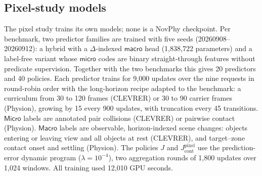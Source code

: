 \begin{revblock}
\subsection{Pixel-study models}

The pixel study trains its own models; none is a NovPhy checkpoint. Per benchmark, two predictor families are trained with five seeds (20260908--20260912): a hybrid with a $\Delta$-indexed $\textsf{macro}$ head (1,838,722 parameters) and a label-free variant whose $\textsf{micro}$ codes are binary straight-through features without predicate supervision. Together with the two benchmarks this gives 20 predictors and 40 policies. Each predictor trains for 9,000 updates over the nine requests in round-robin order with the long-horizon recipe adapted to the benchmark: a curriculum from 30 to 120 frames (CLEVRER) or 30 to 90 carrier frames (Physion), growing by 15 every 900 updates, with truncation every 45 transitions. $\textsf{Micro}$ labels are annotated pair collisions (CLEVRER) or pairwise contact (Physion). $\textsf{Macro}$ labels are observable, horizon-indexed scene changes: objects entering or leaving view and all objects at rest (CLEVRER), and target--zone contact onset and settling (Physion). The policies $J$ and $J_{\mathrm{cont}}^{\mathrm{pixel}}$ use the prediction-error dynamic program ($\lambda=10^{-4}$), two aggregation rounds of 1,800 updates over 1,024 windows. All training used 12,010 GPU seconds.
\end{revblock}

